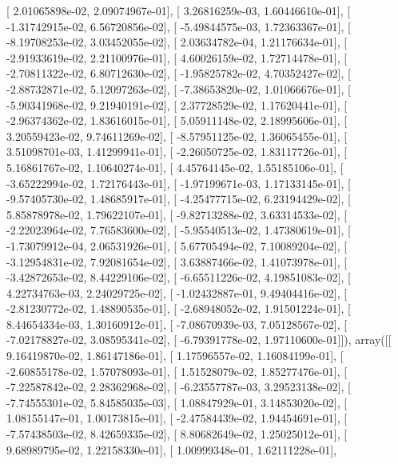\documentclass{article}
\begin{document}
       [  2.01065898e-02,   2.09074967e-01],
       [  3.26816259e-03,   1.60446610e-01],
       [ -1.31742915e-02,   6.56720856e-02],
       [ -5.49844575e-03,   1.72363367e-01],
       [ -8.19708253e-02,   3.03452055e-02],
       [  2.03634782e-04,   1.21176634e-01],
       [ -2.91933619e-02,   2.21100976e-01],
       [  4.60026159e-02,   1.72714478e-01],
       [ -2.70811322e-02,   6.80712630e-02],
       [ -1.95825782e-02,   4.70352427e-02],
       [ -2.88732871e-02,   5.12097263e-02],
       [ -7.38653820e-02,   1.01066676e-01],
       [ -5.90341968e-02,   9.21940191e-02],
       [  2.37728529e-02,   1.17620441e-01],
       [ -2.96374362e-02,   1.83616015e-01],
       [  5.05911148e-02,   2.18995606e-01],
       [  3.20559423e-02,   9.74611269e-02],
       [ -8.57951125e-02,   1.36065455e-01],
       [  3.51098701e-03,   1.41299941e-01],
       [ -2.26050725e-02,   1.83117726e-01],
       [  5.16861767e-02,   1.10640274e-01],
       [  4.45764145e-02,   1.55185106e-01],
       [ -3.65222994e-02,   1.72176443e-01],
       [ -1.97199671e-03,   1.17133145e-01],
       [ -9.57405730e-02,   1.48685917e-01],
       [ -4.25477715e-02,   6.23194429e-02],
       [  5.85878978e-02,   1.79622107e-01],
       [ -9.82713288e-02,   3.63314533e-02],
       [ -2.22023964e-02,   7.76583600e-02],
       [ -5.95540513e-02,   1.47380619e-01],
       [ -1.73079912e-04,   2.06531926e-01],
       [  5.67705494e-02,   7.10089204e-02],
       [ -3.12954831e-02,   7.92081654e-02],
       [  3.63887466e-02,   1.41073978e-01],
       [ -3.42872653e-02,   8.44229106e-02],
       [ -6.65511226e-02,   4.19851083e-02],
       [  4.22734763e-03,   2.24029725e-02],
       [ -1.02432887e-01,   9.49404416e-02],
       [ -2.81230772e-02,   1.48890535e-01],
       [ -2.68948052e-02,   1.91501224e-01],
       [  8.44654334e-03,   1.30160912e-01],
       [ -7.08670939e-03,   7.05128567e-02],
       [ -7.02178827e-02,   3.08595341e-02],
       [ -6.79391778e-02,   1.97110600e-01]]), array([[  9.16419870e-02,   1.86147186e-01],
       [  1.17596557e-02,   1.16084199e-01],
       [ -2.60855178e-02,   1.57078093e-01],
       [  1.51528079e-02,   1.85277476e-01],
       [ -7.22587842e-02,   2.28362968e-02],
       [ -6.23557787e-03,   3.29523138e-02],
       [ -7.74555301e-02,   5.84585035e-03],
       [  1.08847929e-01,   3.14853020e-02],
       [  1.08155147e-01,   1.00173815e-01],
       [ -2.47584439e-02,   1.94454691e-01],
       [ -7.57438503e-02,   8.42659335e-02],
       [  8.80682649e-02,   1.25025012e-01],
       [  9.68989795e-02,   1.22158330e-01],
       [  1.00999348e-01,   1.62111228e-01],
\end{document}
